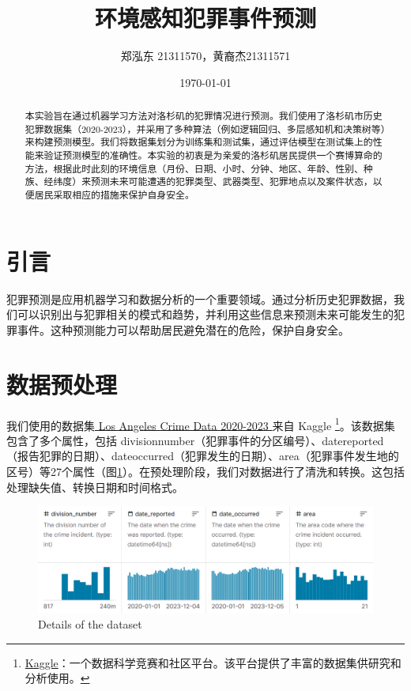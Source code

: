 \documentclass{article}
\begin{document}
\sloppy %

\title{环境感知犯罪事件预测}
\author{郑泓东 21311570，黄裔杰21311571}
\date{\today}

\maketitle

\renewcommand{\abstractname}{摘要}  %

\begin{abstract}
    本实验旨在通过机器学习方法对洛杉矶的犯罪情况进行预测。我们使用了洛杉矶市历史犯罪数据集（2020-2023），并采用了多种算法（例如逻辑回归、多层感知机和决策树等）来构建预测模型。我们将数据集划分为训练集和测试集，通过评估模型在测试集上的性能来验证预测模型的准确性。本实验的初衷是为亲爱的洛杉矶居民提供一个赛博算命的方法，根据此时此刻的环境信息（月份、日期、小时、分钟、地区、年龄、性别、种族、经纬度）来预测未来可能遭遇的犯罪类型、武器类型、犯罪地点以及案件状态，以便居民采取相应的措施来保护自身安全。
\end{abstract}

\section{引言}
犯罪预测是应用机器学习和数据分析的一个重要领域。通过分析历史犯罪数据，我们可以识别出与犯罪相关的模式和趋势，并利用这些信息来预测未来可能发生的犯罪事件。这种预测能力可以帮助居民避免潜在的危险，保护自身安全。

\section{数据预处理}
我们使用的数据集\href{https://www.kaggle.com/datasets/asaniczka/crimes-in-los-angeles-2020-2023/data}{ Los Angeles Crime Data 2020-2023 }来自 Kaggle \footnote{\href{https://www.kaggle.com/}{Kaggle}：一个数据科学竞赛和社区平台。该平台提供了丰富的数据集供研究和分析使用。}。该数据集包含了多个属性，包括 division\textunderscore{}number（犯罪事件的分区编号）、date\textunderscore{}reported（报告犯罪的日期）、date\textunderscore{}occurred（犯罪发生的日期）、area（犯罪事件发生地的区号）等27个属性（图\ref{fig:Details}）。在预处理阶段，我们对数据进行了清洗和转换。这包括处理缺失值、转换日期和时间格式。

\begin{figure}[H]
    \centering
    \includegraphics[width=1\textwidth]{../pic/Screenshot 2024-01-12 111029.png}
    \caption{Details of the dataset}
    \label{fig:Details}
\end{figure}
\end{document}
